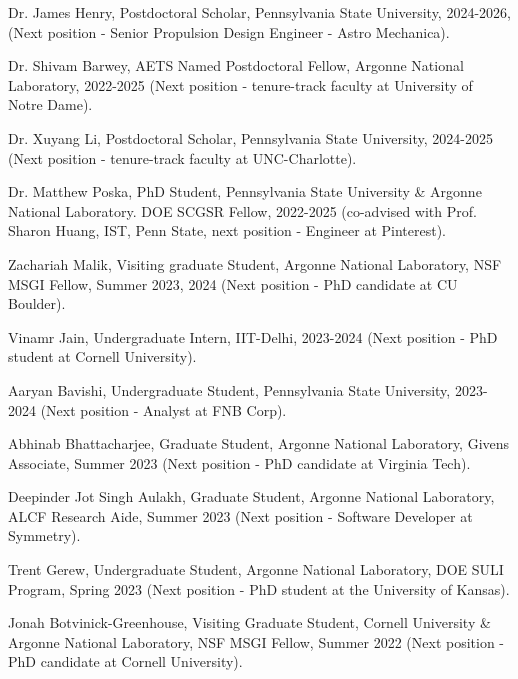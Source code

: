 \documentclass[letterpaper]{article}
\renewenvironment{itemize}{
  \begin{list}{}{
    \setlength{\leftmargin}{1.5em}
  }
}{
  \end{list}
}
\begin{document}
\begin{itemize}
  \item Dr. James Henry, Postdoctoral Scholar, Pennsylvania State University, 2024-2026, (Next position - Senior Propulsion Design Engineer - Astro Mechanica).

  \item Dr. Shivam Barwey, AETS Named Postdoctoral Fellow, Argonne National Laboratory, 2022-2025 (Next position - tenure-track faculty at University of Notre Dame). 

  \item Dr. Xuyang Li, Postdoctoral Scholar, Pennsylvania State University, 2024-2025 (Next position - tenure-track faculty at UNC-Charlotte).

  \item Dr. Matthew Poska, PhD Student, Pennsylvania State University \& Argonne National Laboratory. DOE SCGSR Fellow, 2022-2025 (co-advised with Prof. Sharon Huang, IST, Penn State, next position - Engineer at Pinterest). 

  \item Zachariah Malik, Visiting graduate Student, Argonne National Laboratory, NSF MSGI Fellow, Summer 2023, 2024 (Next position - PhD candidate at CU Boulder).

  \item Vinamr Jain, Undergraduate Intern, IIT-Delhi, 2023-2024 (Next position - PhD student at Cornell University). 

  \item Aaryan Bavishi, Undergraduate Student, Pennsylvania State University, 2023-2024 (Next position - Analyst at FNB Corp).

  \item Abhinab Bhattacharjee, Graduate Student, Argonne National Laboratory, Givens Associate, Summer 2023 (Next position - PhD candidate at Virginia Tech).

  \item Deepinder Jot Singh Aulakh, Graduate Student, Argonne National Laboratory, ALCF Research Aide, Summer 2023 (Next position - Software Developer at Symmetry).

  \item Trent Gerew, Undergraduate Student, Argonne National Laboratory, DOE SULI Program, Spring 2023 (Next position - PhD student at the University of Kansas).

  \item Jonah Botvinick-Greenhouse, Visiting Graduate Student, Cornell University \& Argonne National Laboratory, NSF MSGI Fellow, Summer 2022 (Next position - PhD candidate at Cornell University).


\end{itemize}
\end{document}
